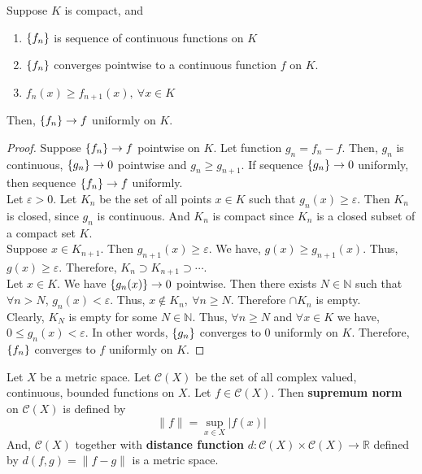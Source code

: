 \begin{theorem} %
	Suppose $K$ is compact, and
	\begin{enumerate}
		\item $\left\{f_n\right\}$ is sequence of continuous functions on $K$
		\item $\left\{f_n\right\}$ converges pointwise to a continuous function $f$ on $K$.
		\item $f_n(x) \ge f_{n+1}(x),\ \forall x \in K$
	\end{enumerate}
	Then, $\left\{f_n\right\} \to f$ uniformly on $K$.
\end{theorem}
\begin{proof}
	Suppose $\left\{f_n\right\} \to f$ pointwise on $K$.
	Let function $g_n = f_n - f$.
	Then, $g_n$ is continuous, $\left\{g_n\right\} \to 0$ pointwise and $g_n \ge g_{n+1}$.
  	If sequence $\left\{g_n\right\} \to 0$ uniformly, then sequence $\left\{f_n\right\} \to f$ uniformly.\\

	Let $\varepsilon > 0$.
	Let $K_n$ be the set of all points $x \in K$ such that $g_n(x) \ge \varepsilon$.
	Then $K_n$ is closed, since $g_n$ is continuous.
	And $K_n$ is compact since $K_n$ is a closed subset of a compact set $K$.\\

	Suppose $x \in K_{n+1}$.
	Then $g_{n+1}(x) \ge \varepsilon$.
	We have, $g(x) \ge g_{n+1}(x)$.
	Thus, $g(x) \ge \varepsilon$.
	Therefore, $K_n \supset K_{n+1} \supset \dotsb$.\\

	Let $x \in K$.
	We have $\left\{g_n(x)\right\} \to 0$ pointwise.
	Then there exists $N \in \mathbb{N}$ such that $\forall n > N$, $g_n(x) < \varepsilon$.
	Thus, $x \notin K_n,\ \forall n \ge N$.
	Therefore $\cap K_n$ is empty.\\

	Clearly, $K_N$ is empty for some $N \in \mathbb{N}$.
	Thus, $\forall n \ge N$ and $\forall x \in K$ we have, $0 \le g_n(x) < \varepsilon$.
	In other words, $\left\{g_n\right\}$ converges to $0$ uniformly on $K$.
	Therefore, $\left\{f_n\right\}$ converges to $f$ uniformly on $K$.
\end{proof}

\begin{definition} %
	Let $X$ be a metric space.
	Let $\mathscr{C}(X)$ be the set of all complex valued, continuous, bounded functions on $X$.
	Let $f \in \mathscr{C}(X)$.
	Then \textbf{supremum norm} on $\mathscr{C}(X)$ is defined by
	\[ \| f \| = \sup_{x \in X} |f(x)| \]
	And, $\mathscr{C}(X)$ together with \textbf{distance function} $d : \mathscr{C}(X) \times \mathscr{C}(X) \to \mathbb{R}$ defined by $d(f,g) = \| f-g \|$ is a metric space.
\end{definition}

